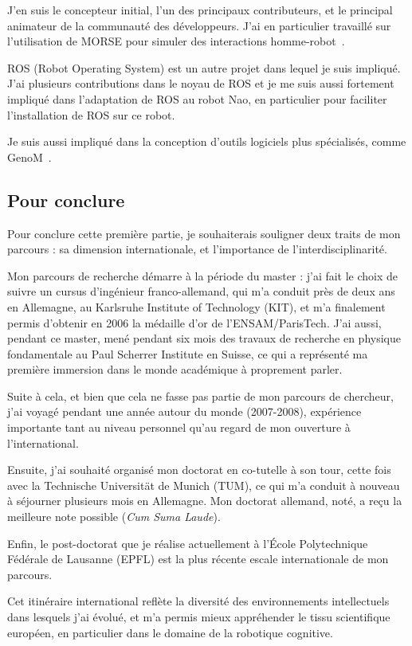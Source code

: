 \documentclass[a4paper]{article}
\begin{document}
J'en suis le concepteur initial, l'un des principaux contributeurs, et le
principal animateur de la communauté des développeurs. J'ai en particulier
travaillé sur l'utilisation de MORSE pour simuler des interactions
homme-robot~\cite{lemaignan2012morse}.

ROS (Robot Operating System) est un autre projet dans lequel je suis impliqué.
J'ai plusieurs contributions dans le noyau de ROS et je me suis aussi fortement
impliqué dans l'adaptation de ROS au robot Nao, en particulier pour faciliter
l'installation de ROS sur ce robot.

Je suis aussi impliqué dans la conception d'outils logiciels plus spécialisés,
comme GenoM~\cite{mallet2010genom3}.

\subsection{Pour conclure}

Pour conclure cette première partie, je souhaiterais souligner deux traits de
mon parcours : sa dimension internationale, et l'importance de
l'interdisciplinarité.

Mon parcours de recherche démarre à la période du master : j'ai fait le choix de
suivre un cursus d'ingénieur franco-allemand, qui m'a conduit près de deux ans
en Allemagne, au Karlsruhe Institute of Technology (KIT), et m'a finalement
permis d'obtenir en 2006 la médaille d'or de l'ENSAM/ParisTech. J'ai aussi,
pendant ce master, mené pendant six mois des travaux de recherche en physique
fondamentale au Paul Scherrer Institute en Suisse, ce qui a représenté ma
première immersion dans le monde académique à proprement parler.

Suite à cela, et bien que cela ne fasse pas partie de mon parcours de chercheur,
j'ai voyagé pendant une année autour du monde (2007-2008), expérience
importante tant au niveau personnel qu'au regard de mon ouverture à
l'international.

Ensuite, j'ai souhaité organisé mon doctorat en co-tutelle à son tour, cette
fois avec la Technische Universität de Munich (TUM), ce qui m'a conduit à
nouveau à séjourner plusieurs mois en Allemagne. Mon doctorat allemand, noté, a
reçu la meilleure note possible (\emph{Cum Suma Laude}).

Enfin, le post-doctorat que je réalise actuellement à l'École Polytechnique
Fédérale de Lausanne (EPFL) est la plus récente escale internationale de mon
parcours.

Cet itinéraire international reflète la diversité des environnements
intellectuels dans lesquels j'ai évolué, et m'a permis mieux appréhender le
tissu scientifique européen, en particulier dans le domaine de la robotique
cognitive.
\end{document}
